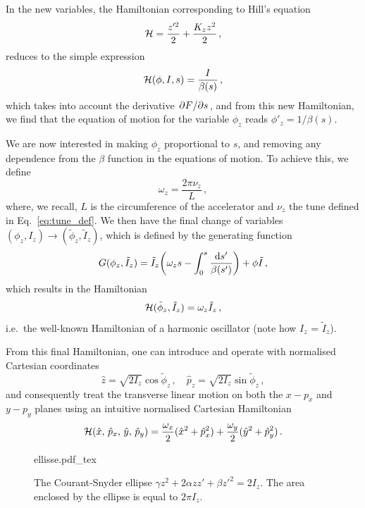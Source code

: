 In the new variables, the Hamiltonian corresponding to Hill's equation
\begin{equation} 
    \mathcal{H} = \frac{z'^2}{2} + \frac{K_z z^2}{2} \,,
\end{equation}
reduces to the simple expression
\begin{equation}
	\mathcal{H}(\phi,I,s) = \frac{I}{\beta(s)}\, ,
\end{equation}
which takes into account the derivative $\pdv*{F}{s}$, and from this new Hamiltonian, we find that the equation of motion for the variable $\phi_z$ reads $\phi'_z = 1/\beta(s)$. 

We are now interested in making $\phi_z$ proportional to $s$, and removing any dependence from the $\beta$ function in the equations of motion. To achieve this, we define 
\begin{equation}
    \omega_z = \frac{2\pi\nu_z}{L} \,,
\end{equation}
where, we recall, $L$ is the circumference of the accelerator and $\nu_z$ the tune defined in Eq.~\eqref{eq:tune_def}. We then have the final change of variables $(\phi_z,I_z)\to(\tilde\phi_z, \tilde I_z)$, which is defined by the generating function
%
\begin{equation}
	G(\phi_z,\tilde I_z) = \tilde I_z\qty(\omega_z s - \int_0^s\frac{\dd s'}{\beta(s')})+\phi\tilde I\, ,
\end{equation}
%
which results in the Hamiltonian
%
\begin{equation}
	\mathcal{H}(\tilde \phi_z,\tilde I_z) = \omega_z \tilde I_z\,,
	\label{eq:harm_ham}
 \end{equation}
%
i.e.\ the well-known Hamiltonian of a harmonic oscillator (note how $I_z$ = $\tilde{I}_z$).

From this final Hamiltonian, one can introduce and operate with normalised Cartesian coordinates 
\begin{equation}
    \hat z=\sqrt{2I_z}\cos\tilde{\phi}_z\,,\quad \hat p_z=\sqrt{2I_z}\sin\tilde{\phi}_z \,,
    \label{eq:2:cart_eq}
\end{equation}
and consequently treat the transverse linear motion on both the $x-p_x$ and $y-p_y$ planes using an intuitive normalised Cartesian Hamiltonian
%
\begin{equation}
	\mathcal{H}(\hat x,\, \hat p_x,\, \hat y,\, \hat p_y) = \frac{\omega_x}{2}(\hat x^2 +\hat p_x^2) + \frac{\omega_y}{2}(\hat y^2+\hat p_y^2)\, .
	\label{eq:linham}
\end{equation}
%

\begin{figure}
    \centering
    \def\svgwidth{0.75\columnwidth}
    {ellisse.pdf_tex}
    \caption{The Courant-Snyder ellipse $\gamma z^2 + 2\alpha zz' + \beta z'^2=2I_z$. The area enclosed by the ellipse is equal to $2\pi I_z$. }
    \label{fig:coursnyd}
\end{figure}


